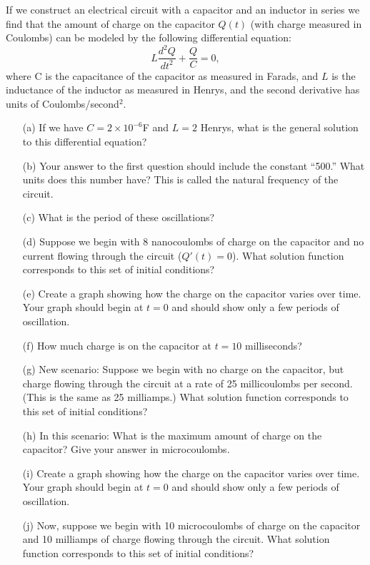 \begin{problem}
    If we construct an electrical circuit with a capacitor and an inductor in series we
    find that the amount of charge on the capacitor $Q(t)$ (with charge measured in
    Coulombs) can be modeled by the following differential equation:
    \[ L \frac{d^2 Q}{dt^2} + \frac{Q}{C} = 0, \]
    where C is the capacitance of the capacitor as measured in Farads, and $L$ is the
    inductance of the inductor as measured in Henrys, and the second derivative has units
    of Coulombs/second$^2$.
    \begin{enumerate}
        \item[(a)] If we have $C=2\times 10^{-6}$F and $L=2$ Henrys, what is the general solution to this
            differential equation? 
        \item[(b)] Your answer to the first question should include the constant ``500.''  What
            units does this number have?  This is called the natural frequency of the
            circuit.
        \item[(c)] What is the period of these oscillations?
        \item[(d)] Suppose we begin with 8 nanocoulombs of charge on the capacitor and no
            current flowing through the circuit ($Q'(t)=0$).  What solution function
            corresponds to this set of initial conditions?
        \item[(e)] Create a graph showing how the charge on the capacitor varies over time.
            Your graph should begin at $t = 0$ and should show only a few periods of
            oscillation.
        \item[(f)] How much charge is on the capacitor at $t = 10$ milliseconds?
        \item[(g)] New scenario:  Suppose we begin with no charge on the capacitor, but
            charge flowing through the circuit at a rate of 25 millicoulombs per second.
            (This is the same as 25 milliamps.)  What solution function corresponds to
            this set of initial conditions?
        \item[(h)] In this scenario:  What is the maximum amount of charge on the capacitor?
            Give your answer in microcoulombs.
        \item[(i)] Create a graph showing how the charge on the capacitor varies over time.
            Your graph should begin at $t = 0$ and should show only a few periods of
            oscillation.
        \item[(j)] Now, suppose we begin with 10 microcoulombs of charge on the capacitor and
            10 milliamps of charge flowing through the circuit.  What solution function
            corresponds to this set of initial conditions?


\end{enumerate}
\end{problem}
